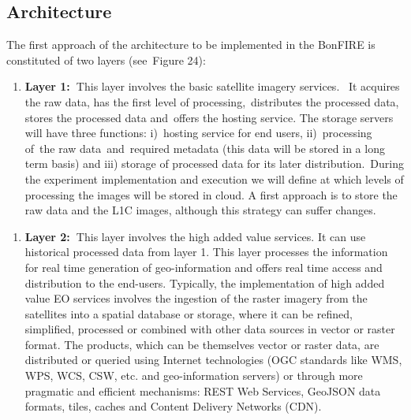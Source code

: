 \documentclass[a4paper]{article}
\newcounter{saveenum}
\newcommand\liststyleLFOxxv{%
\renewcommand\theenumi{\alph{enumi}}
\renewcommand\theenumii{\alph{enumii}}
\renewcommand\theenumiii{\roman{enumiii}}
\renewcommand\theenumiv{\arabic{enumiv}}
\renewcommand\labelenumi{\theenumi)}
\renewcommand\labelenumii{\theenumii.}
\renewcommand\labelenumiii{\theenumiii.}
\renewcommand\labelenumiv{\theenumiv.}
}
\begin{document}
\subsection[Architecture]{Architecture}
\hypertarget{Toc381777210}{}
\bigskip

The first approach of the architecture to be implemented in the BonFIRE
is constituted of two layers (see\ Figure 24):


\bigskip

\liststyleLFOxxv
\setcounter{saveenum}{\value{enumi}}
\begin{enumerate}
\setcounter{enumi}{\value{saveenum}}
\item \textbf{Layer 1}\textbf{:\ }This layer involves the basic
satellite imagery services. \ It acquires the raw data, has the first
level of processing,\ distributes the processed data, stores the
processed data and\ offers the hosting service. The storage servers
will have three functions: i)\ hosting service for end users,
ii)\ processing of\ the raw data\ and\ required metadata (this data
will be stored in a long term basis) and iii) storage of processed data
for its later distribution.\ During the experiment implementation and
execution we will define at which levels of processing the images will
be stored in cloud. A first approach is to store the raw data and the
L1C images, although this strategy can suffer changes.
\end{enumerate}

\bigskip

\liststyleLFOxxv
\setcounter{saveenum}{\value{enumi}}
\begin{enumerate}
\setcounter{enumi}{\value{saveenum}}
\item \textbf{Layer 2:\ }This layer involves the high added value
services. It can use historical processed data from layer 1. This layer
processes the information for real time generation of geo-information
and offers real time access and distribution to the end-users.
Typically, the implementation of high added value EO services involves
the ingestion of the raster imagery from the satellites into a spatial
database or storage, where it can be refined, simplified, processed or
combined with other data sources in vector or raster format. The
products, which can be themselves vector or raster data, are
distributed or queried using Internet technologies (OGC standards like
WMS, WPS, WCS, CSW, etc. and geo-information servers) or through more
pragmatic and efficient mechanisms: REST Web Services, GeoJSON data
formats, tiles, caches and Content Delivery Networks (CDN).\ 
\end{enumerate}
\end{document}
